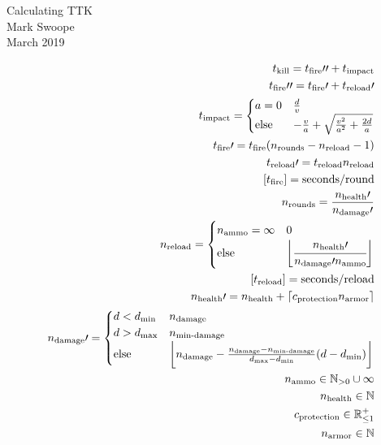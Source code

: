 \documentclass[a4paper,12pt]{article}
\begin{document}
	\begin{center}
		Calculating TTK \\
		Mark Swoope \\
		March 2019 \\
	\end{center}
	\begin{align*}
		t_\text{kill} = t_\text{fire}\prime\prime + t_\text{impact} \\
		t_\text{fire}\prime\prime = t_\text{fire}\prime + t_\text{reload}\prime \\
		t_\text{impact} =
			\begin{cases}
				a = 0 & \frac{d}{v} \\
				\text{else} & -\frac{v}{a} + \sqrt{\frac{v^2}{a^2} + \frac{2d}{a}} \\
			\end{cases} \\
		t_\text{fire}\prime = t_\text{fire}(n_\text{rounds} - n_\text{reload} - 1) \\
		t_\text{reload}\prime = t_\text{reload} n_\text{reload} \\
		[t_\text{fire}] = \text{seconds} / \text{round} \\
		n_\text{rounds} = \frac{n_\text{health}\prime}{n_\text{damage}\prime} \\
		n_\text{reload} = 
			\begin{cases}
				n_\text{ammo} = \infty & 0 \\
				\text{else} & \bigg \lfloor \cfrac{n_\text{health}\prime}{n_\text{damage}\prime n_\text{ammo}} \bigg \rfloor \\
			\end{cases} \\
		[t_\text{reload}] = \text{seconds} / \text{reload}  \\
		n_\text{health}\prime = n_\text{health} + \lceil c_\text{protection} n_\text{armor} \rceil \\
		n_\text{damage}\prime = 
			\begin{cases}
				d < d_\text{min} & n_\text{damage} \\
				d > d_\text{max} & n_\text{min-damage} \\
				\text{else} & \bigg \lfloor n_\text{damage} - \frac{n_\text{damage} - n_\text{min-damage}}{d_\text{max} - d_\text{min}} (d - d_\text{min}) \bigg \rfloor \\
			\end{cases} \\
		n_\text{ammo} \in \mathbb{N}_{>0} \cup \infty \\
		n_\text{health} \in \mathbb{N} \\
		c_\text{protection} \in \mathbb{R}^{+}_{\leq 1} \\
		n_\text{armor} \in \mathbb{N} \\
	\end{align*}
\end{document}

